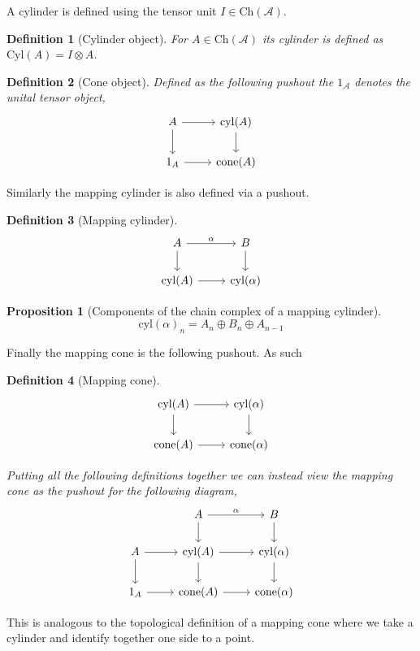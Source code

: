 \documentclass[12pt]{article}
\numberwithin{equation}{section}
\newtheorem{definition}{Definition}[section]
\newtheorem{proposition}{Proposition}[section]
\begin{document}
	A cylinder is defined using the tensor unit $I\in \mathrm{Ch}(\mathcal{A})$.
	\begin{definition}[Cylinder object]
		For $A \in \mathrm{Ch}(\mathcal{A})$ its cylinder is defined as $\mathrm{Cyl}(A)=I \otimes A$.
	\end{definition}
	\begin{definition}[Cone object]
		Defined as the following pushout the $1_\mathcal{A}$ denotes the unital tensor object,
	\[\begin{tikzcd}
		A & {\mathrm{cyl}(A)} \\
		1_A & {\mathrm{cone}(A)}
		\arrow[from=1-1, to=1-2]
		\arrow[from=1-1, to=2-1]
		\arrow[from=2-1, to=2-2]
		\arrow[from=1-2, to=2-2]
	\end{tikzcd}\]
	\end{definition}
	Similarly the mapping cylinder is also defined via a pushout.
	\begin{definition}[Mapping cylinder]\label{mappingcylinder}
		\[\begin{tikzcd}
			A & B \\
			{\mathrm{cyl}(A)} & {\mathrm{cyl}(\alpha)}
			\arrow["\alpha", from=1-1, to=1-2]
			\arrow[from=1-1, to=2-1]
			\arrow[from=1-2, to=2-2]
			\arrow[from=2-1, to=2-2]
		\end{tikzcd}\]
	
	\end{definition}
	
	\begin{proposition}[Components of the chain complex of a mapping cylinder]
		\[ \mathrm{cyl}(\alpha)_n=A_n\oplus B_n \oplus A_{n-1} \]
	\end{proposition}

Finally the mapping cone is the following pushout. As such 
\begin{definition}[Mapping cone]\label{mappingcone}
	\[\begin{tikzcd}
		{\mathrm{cyl}(A)} & {\mathrm{cyl}(\alpha)} \\
		{\mathrm{cone}(A)} & {\mathrm{cone}(\alpha)}
		\arrow[from=1-1, to=1-2]
		\arrow[from=1-1, to=2-1]
		\arrow[from=1-2, to=2-2]
		\arrow[from=2-1, to=2-2]
	\end{tikzcd}\]
	
		Putting all the following definitions together we can instead view the mapping cone as the pushout for the following diagram,
	\[\begin{tikzcd}
		& A & B \\
		A & {\mathrm{cyl}(A)} & {\mathrm{cyl}(\alpha)} \\
		1_A & {\mathrm{cone}(A)} & {\mathrm{cone}(\alpha)}
		\arrow[from=2-2, to=2-3]
		\arrow[from=2-2, to=3-2]
		\arrow[from=2-3, to=3-3]
		\arrow[from=3-2, to=3-3]
		\arrow["\alpha", from=1-2, to=1-3]
		\arrow[from=1-2, to=2-2]
		\arrow[from=1-3, to=2-3]
		\arrow[from=2-1, to=2-2]
		\arrow[from=2-1, to=3-1]
		\arrow[from=3-1, to=3-2]
	\end{tikzcd}\]
\end{definition}
This is analogous to the topological definition of a mapping cone where we take a cylinder and identify together one side to a point.
\end{document}
